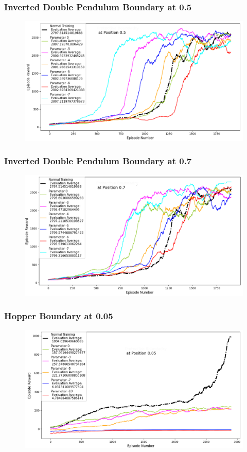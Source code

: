 \documentclass{beamer}
\begin{document}
\begin{frame}
\frametitle{Inverted Double Pendulum Boundary at 0.5}
\begin{figure}
    \centering
	\includegraphics[scale=0.4]{Double_Pendulum_with_Boundary_at_0.5}
\end{figure}
\end{frame}

\begin{frame}
\frametitle{Inverted Double Pendulum Boundary at 0.7}
\begin{figure}
    \centering
	\includegraphics[scale=0.4]{Double_Pendulum_with_Boundary_at_0.7}
\end{figure}
\end{frame}


\begin{frame}
\frametitle{Hopper Boundary at 0.05}
\begin{figure}
    \centering
	\includegraphics[scale=0.4]{Hopper_with_Boundary_at_0.05}
\end{figure}
\end{frame}
\end{document}
